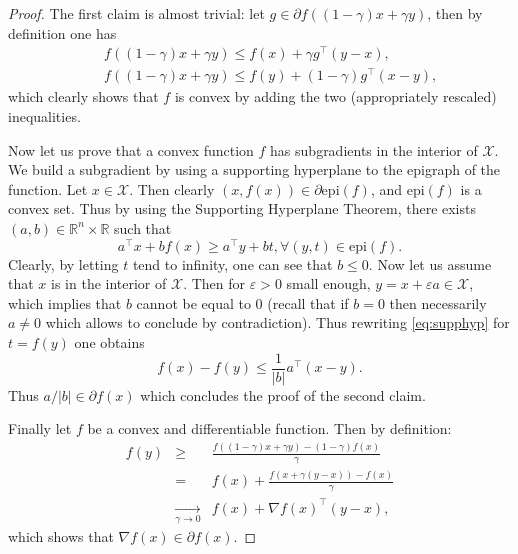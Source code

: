 \documentclass[openany]{now}
\newcommand{\R}{\mathbb{R}}
\renewcommand{\epsilon}{\varepsilon}
\begin{document}
\begin{proof}
The first claim is almost trivial: let $g \in \partial f((1-\gamma) x + \gamma y)$, then by definition one has
\begin{eqnarray*}
& & f((1-\gamma) x + \gamma y) \leq f(x) + \gamma g^{\top} (y - x) , \\
& & f((1-\gamma) x + \gamma y) \leq f(y) + (1-\gamma) g^{\top} (x - y) ,
\end{eqnarray*}
which clearly shows that $f$ is convex by adding the two (appropriately rescaled) inequalities.
\newline

Now let us prove that a convex function $f$ has subgradients in the interior of $\mathcal{X}$. We build a subgradient by using a supporting hyperplane to the epigraph of the function. Let $x \in \mathcal{X}$. Then clearly $(x,f(x)) \in \partial \mathrm{epi}(f)$, and $\mathrm{epi}(f)$ is a convex set. Thus by using the Supporting Hyperplane Theorem, there exists $(a,b) \in \R^n \times \R$ such that
\begin{equation} \label{eq:supphyp}
a^{\top} x + b f(x) \geq a^{\top} y + b t, \forall (y,t) \in \mathrm{epi}(f) .
\end{equation}
Clearly, by letting $t$ tend to infinity, one can see that $b \leq 0$. Now let us assume that $x$ is in the interior of $\mathcal{X}$. Then for $\epsilon > 0$ small enough, $y=x + \epsilon a \in \mathcal{X}$, which implies that $b$ cannot be equal to $0$ (recall that if $b=0$ then necessarily $a \neq 0$ which allows to conclude by contradiction). Thus rewriting \eqref{eq:supphyp} for $t=f(y)$ one obtains
$$f(x) - f(y) \leq \frac{1}{|b|} a^{\top} (x - y) .$$
Thus $a / |b| \in \partial f(x)$ which concludes the proof of the second claim.
\newline

Finally let $f$ be a convex and differentiable function. Then by definition:
\begin{eqnarray*}
f(y) & \geq & \frac{f((1-\gamma) x + \gamma y) - (1- \gamma) f(x)}{\gamma} \\
& = & f(x) + \frac{f(x + \gamma (y - x)) - f(x)}{\gamma} \\
& \underset{\gamma \to 0}{\to} & f(x) + \nabla f(x)^{\top} (y-x),
\end{eqnarray*}
which shows that $\nabla f(x) \in \partial f(x)$.
\end{proof}
\end{document}
